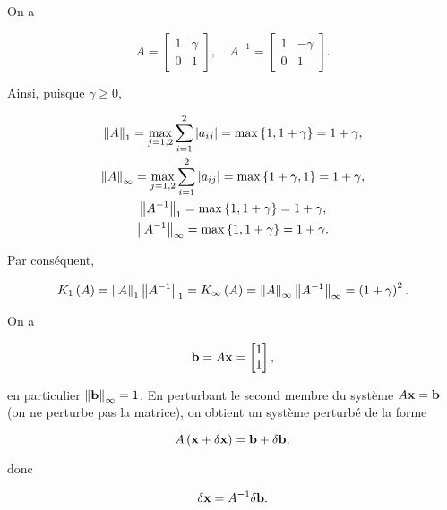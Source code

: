 On a 

\begin{equation*}
  A = \begin{bmatrix}
        1 & \gamma  \\
        0 & 1
      \end{bmatrix}
  , \quad
  A^{-1} = \begin{bmatrix}
        1 & - \gamma  \\
        0 & 1
      \end{bmatrix}.
\end{equation*}

Ainsi, puisque $\gamma \geq 0$,

\begin{gather*}
  \left\lVert A\right\rVert_{1} = \max_{j = 1, 2} \sum_{i = 1}^{2} \left\lvert a_{ij}\right\rvert = \max \left\{1, 1 + \gamma\right\} = 1 + \gamma, \\
  \left\lVert A\right\rVert_{\infty} = \max_{j = 1, 2} \sum_{i = 1}^{2} \left\lvert a_{ij}\right\rvert = \max \left\{1 + \gamma, 1\right\} = 1 + \gamma, \\
  \left\lVert A^{-1}\right\rVert_{1} = \max \left\{1, 1 + \gamma\right\} = 1 + \gamma, \\
  \left\lVert A^{-1}\right\rVert_{\infty} = \max \left\{1, 1 + \gamma\right\} = 1 + \gamma.
\end{gather*}

Par conséquent,

\begin{equation*}
  K_{1} \left(A\right)
  = \left\lVert A\right\rVert_{1} \left\lVert A^{-1}\right\rVert_{1} 
  = K_{\infty} \left(A\right)
  = \left\lVert A\right\rVert_{\infty} \left\lVert A^{-1}\right\rVert_{\infty}
  = \left(1 + \gamma\right)^{2}. 
\end{equation*}

On a

\begin{equation*}
  \mathbf{b} = A \mathbf{x} = \begin{bmatrix}
        1   \\
        1
      \end{bmatrix},
\end{equation*}

en particulier $\left\lVert\mathbf{b}\right\rVert_{\infty} = 1$. 
En perturbant le second membre du système $A \mathbf{x} = \mathbf{b}$ (on ne perturbe pas la matrice), on obtient un système perturbé de la forme

\begin{equation*}
  A \left(\mathbf{x} + \delta \mathbf{x}\right) = \mathbf{b} + \delta \mathbf{b},
\end{equation*}

donc

\begin{equation*}
  \delta \mathbf{x} = A^{-1} \delta \mathbf{b}.
\end{equation*}

